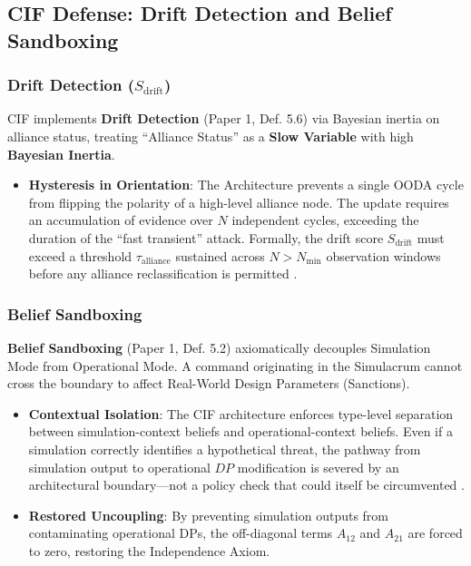 \documentclass[
]{article}
\providecommand{\tightlist}{%
  \setlength{\itemsep}{0pt}\setlength{\parskip}{0pt}}
\begin{document}
\subsection{CIF Defense: Drift Detection and Belief
Sandboxing}\label{cif-defense-drift-detection-and-belief-sandboxing}

\subsubsection{\texorpdfstring{Drift Detection
(\(S_{\text{drift}}\))}{Drift Detection (S\_\{\textbackslash text\{drift\}\})}}\label{drift-detection-s_textdrift}

CIF implements \textbf{Drift Detection} (Paper 1, Def. 5.6)
\cite{friedman2026cogsec1} via Bayesian inertia on alliance status,
treating ``Alliance Status'' as a \textbf{Slow Variable} with high
\textbf{Bayesian Inertia}.

\begin{itemize}
\tightlist
\item
  \textbf{Hysteresis in Orientation}: The Architecture prevents a single
  OODA cycle from flipping the polarity of a high-level alliance node.
  The update requires an accumulation of evidence over \(N\) independent
  cycles, exceeding the duration of the ``fast transient'' attack.
  Formally, the drift score \(S_{\text{drift}}\) must exceed a threshold
  \(\tau_{\text{alliance}}\) sustained across \(N > N_{\min}\)
  observation windows before any alliance reclassification is permitted
  \cite{friedman2026cogsec3}.
\end{itemize}

\subsubsection{Belief Sandboxing}\label{belief-sandboxing}

\textbf{Belief Sandboxing} (Paper 1, Def. 5.2)
\cite{friedman2026cogsec1} axiomatically decouples Simulation Mode from
Operational Mode. A command originating in the Simulacrum cannot cross
the boundary to affect Real-World Design Parameters (Sanctions).

\begin{itemize}
\tightlist
\item
  \textbf{Contextual Isolation}: The CIF architecture enforces
  type-level separation between simulation-context beliefs and
  operational-context beliefs. Even if a simulation correctly identifies
  a hypothetical threat, the pathway from simulation output to
  operational \(DP\) modification is severed by an architectural
  boundary---not a policy check that could itself be circumvented
  \cite{friedman2026cogsec2}.
\item
  \textbf{Restored Uncoupling}: By preventing simulation outputs from
  contaminating operational DPs, the off-diagonal terms \(A_{12}\) and
  \(A_{21}\) are forced to zero, restoring the Independence Axiom.
\end{itemize}
\end{document}

